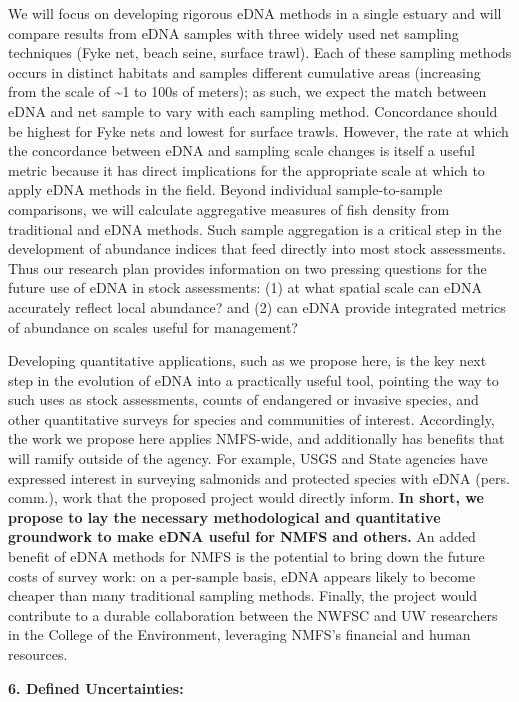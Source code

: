 \documentclass[]{article}
\begin{document}
{ }We will focus on developing rigorous eDNA methods in a single estuary
and will compare results from eDNA samples with three widely used net
sampling techniques (Fyke net, beach seine, surface trawl). Each of
these sampling methods occurs in distinct habitats and samples different
cumulative areas (increasing from the scale of \textasciitilde{}1 to
100s of meters); as such, we expect the match between eDNA and net
sample to vary with each sampling method. Concordance should be highest
for Fyke nets and lowest for surface trawls. However, the rate at which
the concordance between eDNA and sampling scale changes is itself a
useful metric because it has direct implications for the appropriate
scale at which to apply eDNA methods in the field. Beyond individual
sample-to-sample comparisons, we will calculate aggregative measures of
fish density from traditional and eDNA methods. Such sample aggregation
is a critical step in the development of abundance indices that feed
directly into most stock assessments. Thus our research plan provides
information on two pressing questions for the future use of eDNA in
stock assessments: (1) at what spatial scale can eDNA accurately reflect
local abundance? and (2) can eDNA provide integrated metrics of
abundance on scales useful for management?

Developing quantitative applications, such as we propose here, is the
key next step in the evolution of eDNA into a practically useful tool,
pointing the way to such uses as stock assessments, counts of endangered
or invasive species, and other quantitative surveys for species and
communities of interest. Accordingly, the work we propose here applies
NMFS-wide, and additionally has benefits that will ramify outside of the
agency. For example, USGS and State agencies have expressed interest in
surveying salmonids and protected species with eDNA (pers. comm.), work
that the proposed project would directly inform. \textbf{In short, we
propose to lay the necessary methodological and quantitative groundwork
to make eDNA useful for NMFS and others.} An added benefit of eDNA
methods for NMFS is the potential to bring down the future costs of
survey work: on a per-sample basis, eDNA appears likely to become
cheaper than many traditional sampling methods. Finally, the project
would contribute to a durable collaboration between the NWFSC and UW
researchers in the College of the Environment, leveraging NMFS's
financial and human resources.

\textbf{6. Defined Uncertainties:{~}}
\end{document}
